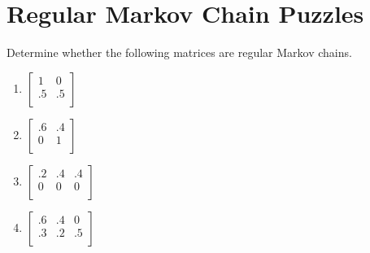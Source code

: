 \section{Regular Markov Chain Puzzles}

\begin{puzzle}
    Determine whether the following matrices are regular Markov chains.
    \begin{enumerate}
        \item \(
              \begin{bmatrix}
                  1  & 0  \\
                  .5 & .5 \\
              \end{bmatrix}
              \)
        \item \(
              \begin{bmatrix}
                  .6 & .4 \\
                  0  & 1  \\
              \end{bmatrix}
              \)
        \item \(
              \begin{bmatrix}
                  .2 & .4 & .4 \\
                  0  & 0  & 0  \\
              \end{bmatrix}
              \)
        \item \(
              \begin{bmatrix}
                  .6 & .4 & 0  \\
                  .3 & .2 & .5 \\
              \end{bmatrix}
              \)
    \end{enumerate}
\end{puzzle}

